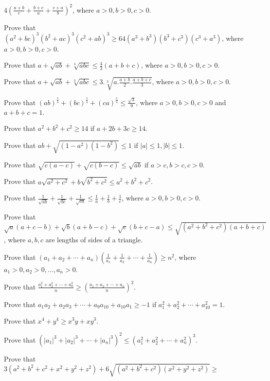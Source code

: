   $4\left(\frac{a + b}{c} + \frac{b + c}{a} + \frac{c + a}{b}\right)^2$, where $a > 0, b > 0, c > 0$.
\item Prove that $(a^2 + bc)^3(b^2 + ac)^3(c^2 + ab)^3\geq 64(a^3 + b^3)(b^3 + c^3)(c^3 + a^3)$, where $a > 0, b > 0, c > 0$.
\item Prove that $a + \sqrt{ab} + \sqrt[3]{abc}\leq \frac{4}{3}(a + b + c)$, where $a > 0, b > 0, c > 0$.
\item Prove that $a + \sqrt{ab} + \sqrt[3]{abc}\leq 3.\sqrt[3]{a . \frac{a + b}{2} . \frac{a + b + c}{3}}$, where $a > 0, b > 0, c
  > 0$.
\item Prove that $(ab)^{\tfrac{5}{4}} + (bc)^{\tfrac{5}{4}} + (ca)^{\tfrac{5}{4}} \leq \frac{\sqrt{3}}{9}$, where $a > 0, b > 0, c >
  0$ and $a + b + c = 1$.
\item Prove that $a^2 + b^2 + c^2 \geq 14$ if $a + 2b + 3c\geq 14$.
\item Prove that $ab + \sqrt{(1 - a^2)(1 - b^2)}\leq 1$ if $|a|\leq 1, |b|\leq 1$.
\item Prove that $\sqrt{c(a - c)} + \sqrt{c(b - c)}\leq \sqrt{ab}$ if $a > c, b > c, c > 0$.
\item Prove that $a\sqrt{a^2 + c^2} + b\sqrt{b^2 + c^2}\leq a^2 + b^2 + c^2$.
\item Prove that $\frac{1}{\sqrt{ab}} + \frac{1}{\sqrt{bc}} + \frac{1}{\sqrt{ca}}\leq \frac{1}{a} + \frac{1}{b} + \frac{1}{c}$,
  where $a > 0, b > 0, c > 0$.
\item Prove that $\sqrt{a}(a + c - b) + \sqrt{b}(a + b - c) + \sqrt{c}(b + c - a)\leq \sqrt{(a^2 + b^2 + c^2)(a + b + c)}$, where
  $a, b, c$ are lengths of sides of a triangle.
\item Prove that $(a_1 + a_2 + \cdots + a_n)\left(\frac{1}{a_1} + \frac{1}{a_2} + \cdots + \frac{1}{a_n}\right)\geq n^2$, where
  $a_1 > 0, a_2 > 0, \ldots, a_n > 0$.
\item Prove that $\frac{a_1^2 + a_2^2 + \cdots + a_n^2}{n}\geq \left(\frac{a_1 + a_2 + \cdots + a_n}{n}\right)^2$.
\item Prove that $a_1a_2 + a_2a_3 + \cdots + a_9a_{10} + a_{10}a_1\geq -1$ if $a_1^2 + a_2^2 + \cdots + a_{10}^2 = 1$.
\item Prove that $x^4 + y^4 \geq x^3y + xy^3$.
\item Prove that $\left(|a_1|^3 + |a_2|^3 + \cdots + |a_n|^3\right)^2\leq \left(a_1^2 + a_2^2 + \cdots + a_n^2\right)^3$.
\item Prove that $3\left(a^2 + b^2 + c^2 + x^2 + y^2 + z^2\right) + 6\sqrt{\left(a^2 + b^2 + c^2\right)\left(x^2 + y^2 +
  z^2\right)}\geq$

